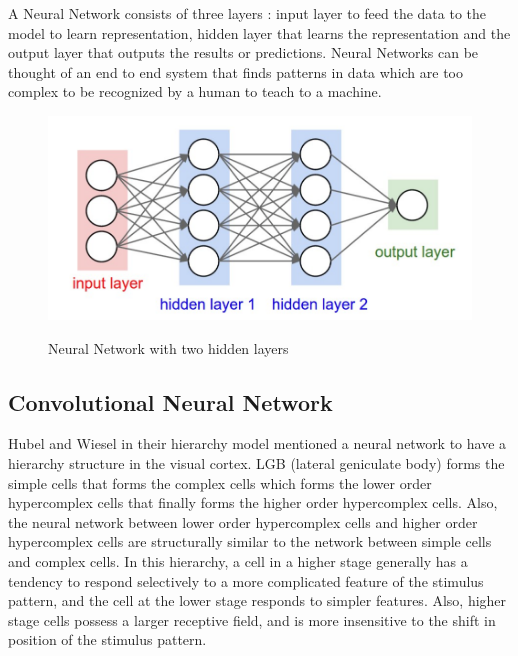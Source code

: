 A Neural Network consists of three layers : input layer to feed the data to the model to learn representation, hidden layer that learns the representation and the output layer that outputs the results or predictions. Neural Networks can be thought of an end to end system that finds patterns in data which are too complex to be recognized by a human to teach to a machine. 


\begin{figure}[H]
\begin{center}
\includegraphics[height=.28\textheight]{Chapter2/Figs/TwoLayeredNN.png}
\label{fig:Two Layered Neural_Network}
\caption{Neural Network with two hidden layers \cite{karparthy}}
\end{center}
\end{figure}


\subsection{Convolutional Neural Network}

Hubel and Wiesel in their hierarchy model mentioned a neural network to have a hierarchy structure in the visual cortex. LGB (lateral geniculate body) forms the simple cells that forms the complex cells which forms the lower order hypercomplex cells that finally forms the higher order hypercomplex cells.
Also, the neural network between lower order hypercomplex cells and higher order hypercomplex cells are structurally similar to the network between simple cells and complex cells. In this hierarchy, a cell in a higher stage generally has a tendency to respond selectively to a more complicated feature of the stimulus pattern, and the cell at the lower stage responds to simpler features. Also, higher stage cells possess a larger receptive field, and is more insensitive to the shift in position of the stimulus pattern.

